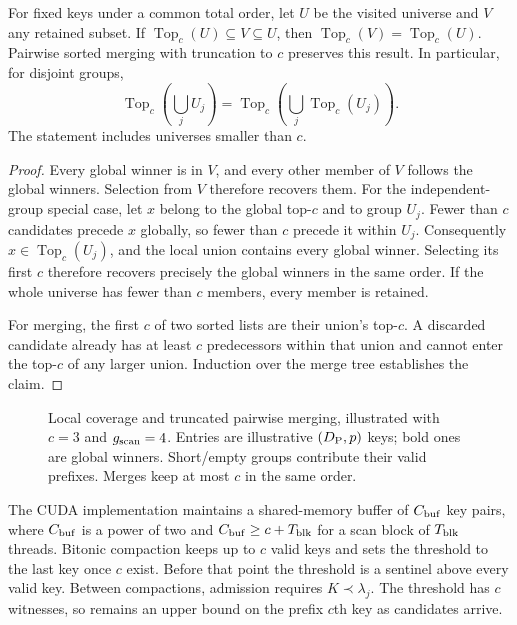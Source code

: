\begin{resultblock}
\begin{proposition}
\label{prop:5-local-coverage}
For fixed keys under a common total order, let $U$ be the visited
universe and $V$ any retained subset. If
$\operatorname{Top}_c(U)\subseteq V\subseteq U$, then
$\operatorname{Top}_c(V)=\operatorname{Top}_c(U)$.
Pairwise sorted merging with truncation to $c$ preserves this result.
In particular, for disjoint groups,
\begin{equation}
 \operatorname{Top}_c\!\left(\bigcup_j U_j\right)
 =\operatorname{Top}_c\!\left(\bigcup_j
                    \operatorname{Top}_c(U_j)\right).
 \label{eq:5-topc-union}
\end{equation}
The statement includes universes smaller than $c$.
\end{proposition}
\begin{proof}
Every global winner is in $V$, and every other member of $V$ follows
the global winners. Selection from $V$ therefore recovers them.
For the independent-group special case, let $x$ belong to the global
top-$c$ and to group $U_j$. Fewer than $c$
candidates precede $x$ globally, so fewer than $c$ precede it within $U_j$.
Consequently $x\in\operatorname{Top}_c(U_j)$, and the local union contains
every global winner. Selecting its first $c$ therefore recovers precisely
the global winners in the same order. If the whole universe has fewer
than $c$ members, every member is retained.

For merging, the first $c$ of two sorted lists are their union's
top-$c$. A discarded candidate already has at least $c$ predecessors
within that union and cannot enter the top-$c$ of any larger union.
Induction over the merge tree establishes the claim.
\end{proof}
\end{resultblock}

\begin{figure}[tbp]
\centering

\caption[Local coverage and truncated pairwise merging]{Local coverage and truncated pairwise merging, illustrated with
$c=3$ and $g_{\mathrm{scan}}=4$. Entries are illustrative $(D_{\mathrm{P}},p)$ keys; bold ones are global winners. Short/empty groups contribute their valid prefixes. Merges keep at most $c$ in the same order.}
\label{fig:5-global-selection}
\end{figure}

The CUDA implementation maintains a shared-memory buffer of $C_{\rm buf}$ key
pairs, where $C_{\rm buf}$ is a power of two and $C_{\rm buf}\geq c+T_{\rm blk}$ for a scan block of
$T_{\rm blk}$ threads. Bitonic compaction keeps up to $c$ valid keys and sets the threshold to the last key once $c$ exist. Before that point the
threshold is a sentinel above every valid key. Between compactions, admission requires $K\prec\lambda_j$. The threshold has $c$ witnesses, so remains an upper bound on the prefix $c$th key as candidates arrive.

